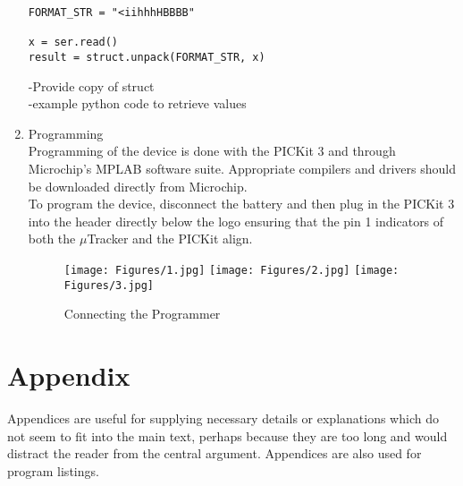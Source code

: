 \documentclass[12pt,openany,a4paper]{book}
\begin{document}
\begin{enumerate}
\begin{lstlisting}
FORMAT_STR = "<iihhhHBBBB"

x = ser.read()
result = struct.unpack(FORMAT_STR, x)
		\end{lstlisting}
		
		-Provide copy of struct \\
		-example python code to retrieve values\\
	\item Programming \\
		Programming of the device is done with the PICKit 3 and through Microchip's MPLAB software suite. Appropriate compilers and drivers should be downloaded directly from Microchip. \\
		
		To program the device, disconnect the battery and then plug in the PICKit 3 into the header directly below the logo ensuring that the pin 1 indicators of both the $\mu$Tracker and the PICKit align. \\ 
		
			\begin{figure}[H]
				\centering
				\texttt{[image: Figures/1.jpg]}
				\texttt{[image: Figures/2.jpg]}
				\texttt{[image: Figures/3.jpg]}
				\caption{Connecting the Programmer}
				\label{fig:PROGRAMMING}
			\end{figure}
		
\end{enumerate}


\appendix


\newpage
{}
\mbox{}
\newpage



\chapter{Appendix}

Appendices are useful for supplying necessary details or explanations
which do not seem to fit into the main text, perhaps because they are
too long and would distract the reader from the central argument.
Appendices are also used for program listings.
\end{document}
